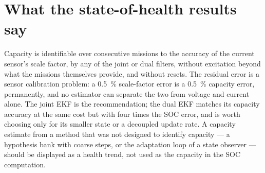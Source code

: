 \section{What the state-of-health results say}

Capacity is identifiable over consecutive missions to the accuracy of the current sensor's
scale factor, by any of the joint or dual filters, without excitation beyond what the missions
themselves provide, and without resets. The residual error is a sensor calibration problem: a
\SI{0.5}{\percent} scale-factor error is a \SI{0.5}{\percent} capacity error, permanently, and
no estimator can separate the two from voltage and current alone. The joint EKF is the
recommendation; the dual EKF matches its capacity accuracy at the same cost but with four times
the SOC error, and is worth choosing only for its smaller state or a decoupled update rate. A capacity estimate from a method that was not designed to identify capacity --- a
hypothesis bank with coarse steps, or the adaptation loop of a state observer --- should be
displayed as a health trend, not used as the capacity in the SOC computation.

